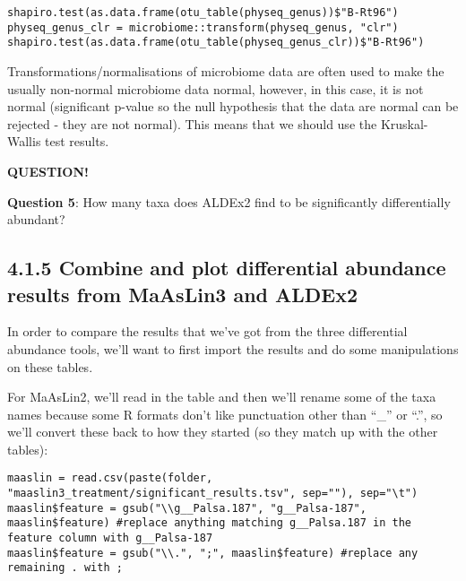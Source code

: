 \documentclass[
]{book}
\newenvironment{bluebox}{
  \definecolor{shadecolor}{RGB}{172, 210, 237}
  \color{white}
  \begin{shaded}}
 {\end{shaded}}
\begin{document}
\begin{verbatim}
shapiro.test(as.data.frame(otu_table(physeq_genus))$"B-Rt96")
physeq_genus_clr = microbiome::transform(physeq_genus, "clr")
shapiro.test(as.data.frame(otu_table(physeq_genus_clr))$"B-Rt96")
\end{verbatim}

Transformations/normalisations of microbiome data are often used to make the usually non-normal microbiome data normal, however, in this case, it is not normal (significant p-value so the null hypothesis that the data are normal can be rejected - they are not normal). This means that we should use the Kruskal-Wallis test results.

\begin{bluebox}

\begin{center}
\textbf{QUESTION!}

\end{center}

\textbf{Question 5}: How many taxa does ALDEx2 find to be significantly differentially abundant?

\end{bluebox}

\subsection{4.1.5 Combine and plot differential abundance results from MaAsLin3 and ALDEx2}\label{combine-and-plot-differential-abundance-results-from-maaslin3-and-aldex2}

In order to compare the results that we've got from the three differential abundance tools, we'll want to first import the results and do some manipulations on these tables.

For MaAsLin2, we'll read in the table and then we'll rename some of the taxa names because some R formats don't like punctuation other than ``\_'' or ``.'', so we'll convert these back to how they started (so they match up with the other tables):

\begin{verbatim}
maaslin = read.csv(paste(folder, "maaslin3_treatment/significant_results.tsv", sep=""), sep="\t")
maaslin$feature = gsub("\\g__Palsa.187", "g__Palsa-187", maaslin$feature) #replace anything matching g__Palsa.187 in the feature column with g__Palsa-187
maaslin$feature = gsub("\\.", ";", maaslin$feature) #replace any remaining . with ;
\end{verbatim}
\end{document}
